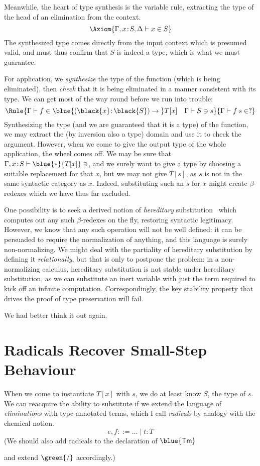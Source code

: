 \documentclass[natbib]{article}
\makeatletter
\newcommand{\anonymous}{\kern0.06em \vbox{\hrule\@width.5em}}
\def\resethooks{%
  \global\let\SaveRestoreHook\empty
  \global\let\ColumnHook\empty}
\let\hspre\empty
\let\hspost\empty
\newcommand{\type}{\blue{\ast}}
\newcommand{\hb}{\!:\!}
\newcommand{\PI}[2]{\blue{(\black{#1}\hb \black{#2})\to\;}}
\newcommand{\D}[1]{\blue{\mathsf{#1}}}
\newcommand{\C}[1]{\red{\mathsf{#1}}}
\newcommand{\F}[1]{\green{\mathsf{#1}}}
\newcommand{\V}[1]{\purple{\mathit{#1}}}
\makeatother
\begin{document}
Meanwhile, the heart of type synthesis is the variable rule, extracting the type of the head of an elimination from the context.
\[
\Axiom{\SYN{\Gamma,x\hb S,\Delta}{x}{S}}
\]
The synthesized type comes directly from the input context which is presumed valid, and must thus confirm that $S$ is indeed a type, which is what we must guarantee.

For application, we \emph{synthesize} the type of the function (which is being eliminated), then \emph{check} that it is being eliminated in a manner consistent with its type.
We can get most of the way round before we run into trouble:
\[
\Rule{\SYN\Gamma f {\PI xS T[x]} \quad \CHK\Gamma Ss}
     {\SYN\Gamma{f\:s}{?}}
\]
Synthesizing the type (and we are guaranteed that it is a type) of the function, we may extract the (by inversion also a type) domain and use it to check the argument. However, when we come to give the output type of the whole application, the wheel comes off. We may be sure that $\CHK{\Gamma,x\hb S}\type{T[x]}$, and we surely want to give a type by choosing a suitable replacement for that $x$, but we may not give $T[s]$, as $s$ is not in the same syntactic category as $x$. Indeed, substituting such an $s$ for $x$ might create $\beta$-redexes which we have thus far excluded.

One possibility is to seek a derived notion of \emph{hereditary}
substitution~\cite{DBLP:conf/types/WatkinsCPW03} which computes out
any such $\beta$-redexes on the fly, restoring syntactic
legitimacy. However, we know that any such operation will not be well
defined: it can be persuaded to require the normalization of
anything, and this language is surely non-normalizing. We might deal
with the partiality of hereditary substitution by defining it
\emph{relationally}, but that is only to postpone the problem: in a
non-normalizing calculus, hereditary substitution is not stable under
hereditary substitution, as we can substitute an inert variable with
just the term required to kick off an infinite
computation. Correspondingly, the key stability property that drives
the proof of type preservation will fail.

We had better think it out again.


\section{Radicals Recover Small-Step Behaviour}

When we come to instantiate $T[x]$ with $s$, we do at least know $S$, the type of $s$. We can reacquire the ability to substitute if we extend the language of \emph{eliminations} with type-annotated terms, which I call \emph{radicals} by analogy with the chemical notion.
\[
e,f ::= \ldots \;|\; t\hb T
\]
(We should also add radicals to the declaration of \ensuremath{\D{Tm}}
\resethooks
and extend \ensuremath{\F{\slash}} accordingly.)
\end{document}
